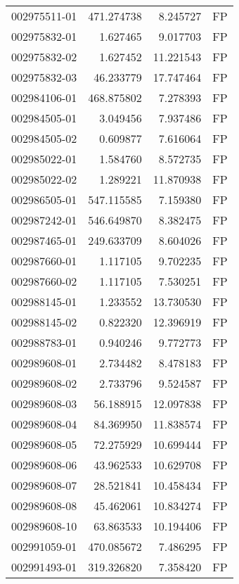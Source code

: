 \begin{tabular}{lrrl}
002975511-01 &  471.274738 &       8.245727 &   FP \\
002975832-01 &    1.627465 &       9.017703 &   FP \\
002975832-02 &    1.627452 &      11.221543 &   FP \\
002975832-03 &   46.233779 &      17.747464 &   FP \\
002984106-01 &  468.875802 &       7.278393 &   FP \\
002984505-01 &    3.049456 &       7.937486 &   FP \\
002984505-02 &    0.609877 &       7.616064 &   FP \\
002985022-01 &    1.584760 &       8.572735 &   FP \\
002985022-02 &    1.289221 &      11.870938 &   FP \\
002986505-01 &  547.115585 &       7.159380 &   FP \\
002987242-01 &  546.649870 &       8.382475 &   FP \\
002987465-01 &  249.633709 &       8.604026 &   FP \\
002987660-01 &    1.117105 &       9.702235 &   FP \\
002987660-02 &    1.117105 &       7.530251 &   FP \\
002988145-01 &    1.233552 &      13.730530 &   FP \\
002988145-02 &    0.822320 &      12.396919 &   FP \\
002988783-01 &    0.940246 &       9.772773 &   FP \\
002989608-01 &    2.734482 &       8.478183 &   FP \\
002989608-02 &    2.733796 &       9.524587 &   FP \\
002989608-03 &   56.188915 &      12.097838 &   FP \\
002989608-04 &   84.369950 &      11.838574 &   FP \\
002989608-05 &   72.275929 &      10.699444 &   FP \\
002989608-06 &   43.962533 &      10.629708 &   FP \\
002989608-07 &   28.521841 &      10.458434 &   FP \\
002989608-08 &   45.462061 &      10.834274 &   FP \\
002989608-10 &   63.863533 &      10.194406 &   FP \\
002991059-01 &  470.085672 &       7.486295 &   FP \\
002991493-01 &  319.326820 &       7.358420 &   FP \\

\end{tabular}

